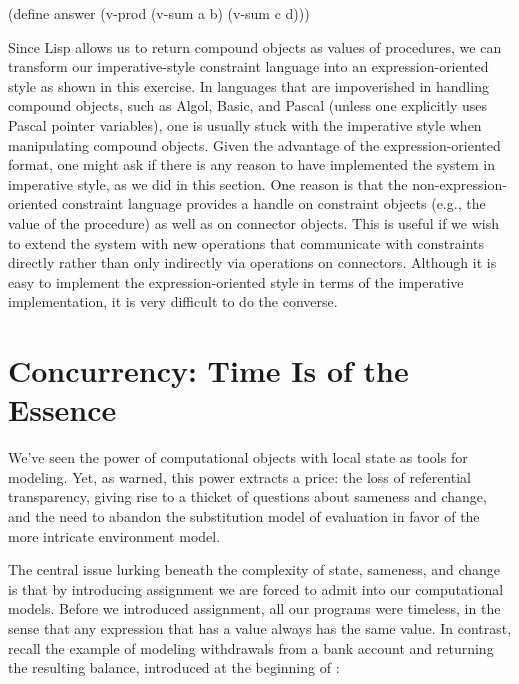 \begin{exerciseGroup}
{\begin{compactCodeBlock}
(define answer (v-prod (v-sum a b) (v-sum c d)))
\end{compactCodeBlock}

\noindent
Since Lisp allows us to return compound objects as values of procedures, we can
transform our imperative-style constraint language into an expression-oriented
style as shown in this exercise.  In languages that are impoverished in
handling compound objects, such as Algol, Basic, and Pascal (unless one
explicitly uses Pascal pointer variables), one is usually stuck with the
imperative style when manipulating compound objects.  Given the advantage of
the expression-oriented format, one might ask if there is any reason to have
implemented the system in imperative style, as we did in this section.  One
reason is that the non-expression-oriented constraint language provides a
handle on constraint objects (e.g., the value of the  procedure) as
well as on connector objects.  This is useful if we wish to extend the system
with new operations that communicate with constraints directly rather than only
indirectly via operations on connectors.  Although it is easy to implement the
expression-oriented style in terms of the imperative implementation, it is very
difficult to do the converse.}
\end{exerciseGroup}

\section{Concurrency: Time Is of the Essence}
\label{Section 3.4}

We've seen the power of computational objects with local state as tools for
modeling.  Yet, as  warned, this power extracts a price: the
loss of referential transparency, giving rise to a thicket of questions about
sameness and change, and the need to abandon the substitution model of
evaluation in favor of the more intricate environment model.

The central issue lurking beneath the complexity of state, sameness, and change
is that by introducing assignment we are forced to admit  into
our computational models.  Before we introduced assignment, all our programs
were timeless, in the sense that any expression that has a value always has the
same value.  In contrast, recall the example of modeling withdrawals from a
bank account and returning the resulting balance, introduced at the beginning
of :

